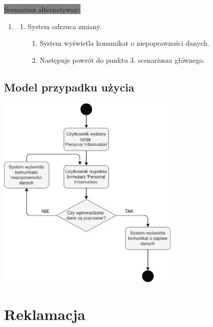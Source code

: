 \documentclass[10pt]{report}
\begin{document}
			\colorbox{grey}{Scenariusz alternatywny:}
			\begin{enumerate}\addtocounter{enumi}{5}
				\item[]
				\begin{enumerate}
					\item System odrzuca zmiany.
					\begin{enumerate}
						\item System wyświetla komunikat o niepoprawności danych.
						\item Następuje powrót do punktu 3. scenariusza głównego.
					\end{enumerate}
				\end{enumerate}
			\end{enumerate}
		
		
		\subsection{Model przypadku użycia}
			\begin{center}
				\includegraphics[width=250pt]{edycja.pdf}
			\end{center}
			 

	\section{Reklamacja}
	
\end{document}
